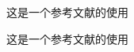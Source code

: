 \documentclass[UTF8]{ctexart}
\begin{document}
    这是一个参考文献的使用\cite{name1} 

    这是一个参考文献的使用\cite{name2}
    
\end{document}
